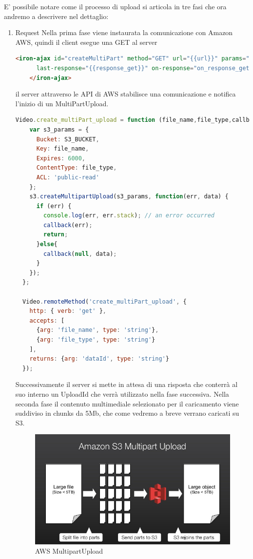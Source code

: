 E’ possibile notare come il processo di upload si articola in tre fasi che ora andremo a descrivere nel dettaglio:
\begin{enumerate}
\item {Request}
   Nella prima fase viene instaurata la comunicazione con Amazon AWS, quindi il client esegue una GET al server
  \begin{lstlisting}[language=html]
  <iron-ajax id="createMultiPart" method="GET" url="{{url}}" params="{{params}}"
      last-response="{{response_get}}" on-response="on_response_get">
    </iron-ajax>
\end{lstlisting}
il server attraverso le API di AWS stabilisce una comunicazione e notifica l’inizio di un MultiPartUpload.
\begin{lstlisting}[language=javascript]
Video.create_multiPart_upload = function (file_name,file_type,callback){
    var s3_params = {
      Bucket: S3_BUCKET,
      Key: file_name,
      Expires: 6000,
      ContentType: file_type,
      ACL: 'public-read'      
    };
    s3.createMultipartUpload(s3_params, function(err, data) {
      if (err) {
        console.log(err, err.stack); // an error occurred
        callback(err);
        return;
      }else{
        callback(null, data);
      }
    });
  };
  
  Video.remoteMethod('create_multiPart_upload', {
    http: { verb: 'get' },
    accepts: [
      {arg: 'file_name', type: 'string'},
      {arg: 'file_type', type: 'string'}
    ],
    returns: {arg: 'dataId', type: 'string'}
  });

\end{lstlisting}
Successivamente il server si mette in attesa di una risposta che conterrà al suo interno un UploadId che verrà utilizzato nella fase successiva.
Nella seconda fase il contenuto multimediale selezionato per il caricamento viene suddiviso in chunks da 5Mb, che come vedremo a breve verrano caricati su S3.




\begin{figure}[htb]
 \centering
 \includegraphics[width=1.0\linewidth]{images/chapter6/multipart.jpg}\hfill
 \caption[Web Components]{AWS MultipartUpload}
 \label{fig:fourV}
\end{figure}



\end{enumerate}
